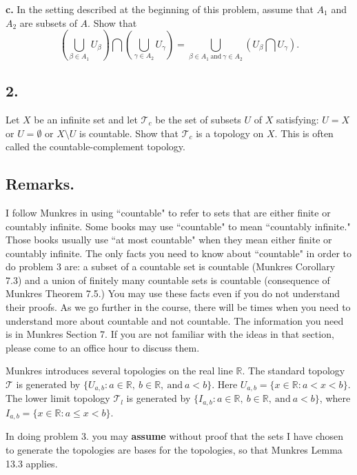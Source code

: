 \documentclass{amsart}
\theoremstyle{plain}
\theoremstyle{definition}
\theoremstyle{remark}
\begin{document}
{\bfseries c.} In the setting described at the beginning of this problem, assume that $A_1$ and $A_2$ are subsets of $A$. Show that
\[
    \left( \bigcup _{\beta \in A_1} U_{\beta} \right) \bigcap \left( \bigcup _{\gamma \in A_2} U_{\gamma} \right) = \bigcup _{\beta \in A_1 \ \mbox{and} \ \gamma \in A_2} (U_{\beta} \bigcap U_{\gamma}).
\]


\vspace{.15in}

\noindent
\subsection*{2.} Let $X$ be an infinite set and let $\mathcal T _c$ be the set of subsets $U$ of $X$ satisfying: $U=X$ or $U=\emptyset$ or $X\setminus U$ is countable. Show that $\mathcal T _c$ is a topology on $X$. This is often called the countable-complement topology.

\subsection*{Remarks.} I follow Munkres in using ``countable" to refer to sets that are either finite or countably infinite. Some books may use ``countable" to mean ``countably infinite." Those books usually use ``at most countable" when they mean either finite or countably infinite. The only facts you need to know about ``countable" in order to do problem 3 are: a subset of a countable set is countable (Munkres Corollary 7.3) and a union of finitely many countable sets is countable (consequence of Munkres Theorem 7.5.) You may use these facts even if you do not understand their proofs. As we go further in the course, there will be times when you need to understand more about countable and not countable. The information you need is in Munkres Section 7. If you are not familiar with the ideas in that section, please come to an office hour to discuss them.

\vspace{.15in}

Munkres introduces several topologies on the real line $\mathbb R$. The standard topology $\mathcal T$ is generated by $\{ U_{a, b} : a\in \mathbb R, \ b\in \mathbb R, \ \mbox{and} \ a < b\}$. Here $U_{a, b} = \{ x\in \mathbb R : a < x < b\}$. The lower limit topology $\mathcal T _l$ is generated by $\{ I_{a, b} : a\in \mathbb R, \ b\in \mathbb R, \ \mbox{and} \ a < b\}$, where $I_{a, b} = \{ x\in \mathbb R : a \le x < b\}$.

In doing problem 3. you may {\bfseries assume} without proof that the sets I have chosen to generate the topologies are bases for the topologies, so that Munkres Lemma 13.3 applies.
\end{document}

